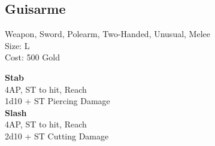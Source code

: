 \subsection{Guisarme}\label{weapon:guisarme}
Weapon, Sword, Polearm, Two-Handed, Unusual, Melee\\
Size: L\\
Cost: 500 Gold

\textbf{Stab}\\
4AP, ST to hit,  Reach\\
1d10 + \texttimes ST Piercing Damage\\

\textbf{Slash}\\
4AP, ST to hit,  Reach\\
2d10 + \texttimes ST Cutting Damage\\
